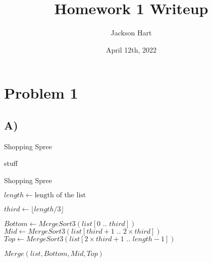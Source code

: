 \documentclass[12pt, letterpaper]{article}
\title{Homework 1 Writeup}
\author{Jackson Hart}
\date{April 12th, 2022}
\begin{document}
\maketitle

\section*{Problem 1}
\subsection*{A)}

\begin{algorithm}
\caption{Shopping Spree}
\begin{algorithmic}
\State stuff
\end{algorithmic}
\end{algorithm}

\begin{algorithm}
\caption{Shopping Spree}
\begin{algorithmic}


\State $length \gets \text{length of the list}$

\State
{}
\EndIf

\State
\State $third \gets \lfloor length / 3 \rfloor$
\State

\State $Bottom \gets MergeSort3(list[0 \text{ .. } third])$
\State $Mid \gets MergeSort3(list[third+1 \text{ .. } 2 \times third])$
\State $Top \gets MergeSort3(list[2 \times third+1 \text{ .. } length-1])$

\State
\State $Merge(list, Bottom, Mid, Top)$

\EndProcedure
\State
\State

\end{algorithmic}
\end{algorithm}
\end{document}
